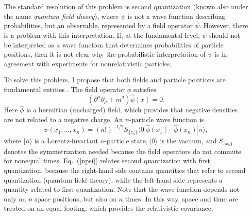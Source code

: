 \documentclass[12pt]{article} %
\begin{document}
The standard resolution of this problem is 
second quantization (known also under the name {\em quantum field theory}), 
where $\psi$ is not a 
wave function describing probabilities, but an observable, represented 
by a field operator $\hat{\psi}$. 
However, there is a problem with this interpretation.
If, at the fundamental level,
$\psi$ should not be interpreted as a wave function
that determines probabilities of particle positions, then
it is not clear
why the probabilistic interpretation of $\psi$ is in 
agreement with experiments for nonrelativistic particles. 

To solve this problem, I propose that both fields and particle positions 
are fundamental entities \cite{nikolfpl1,nikolfpl2}. 
The field operator $\hat{\phi}$ satisfies
\begin{equation}
(\partial^{\mu}\partial_{\mu}+m^2)\hat{\phi}(x)=0 .
\end{equation}
Here
$\hat{\phi}$ is a hermitian (uncharged) field, which provides that
negative densities are not related to a negative charge. 
An $n$-particle wave function is
\begin{equation}\label{npsi}
\psi(x_1,\ldots ,x_n)=(n!)^{-1/2}S_{\{ x_a\} }
\langle 0|\hat{\phi}(x_1)\cdots\hat{\phi}(x_n)|n\rangle ,
\end{equation}
where $|n\rangle$ is a Lorentz-invariant $n$-particle state, 
$|0\rangle$ is the vacuum, and $S_{\{ x_a\} }$ denotes the symmetrization
needed because the field operators do not commute for nonequal times.
Eq.~(\ref{npsi}) relates second quantization with first quantization, 
because the right-hand side contains quantities that refer to 
second quantization (quantum field theory), while the left-hand side 
represents a quantity related to first quantization.
Note that the wave function depends not only on $n$ 
space positions, but also on $n$ times. In this way, 
space and time are treated on an equal footing, which provides the 
relativistic covariance.
\end{document}
